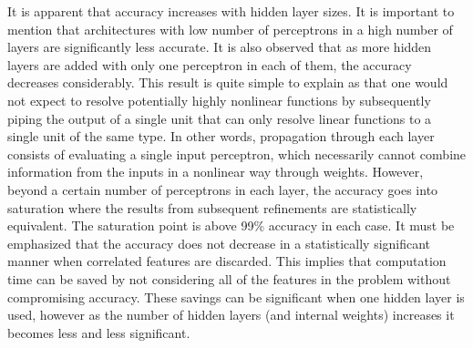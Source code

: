\documentclass[paper=a4, fontsize=11pt]{scrartcl} %
\begin{document}
It is apparent that accuracy increases with hidden layer sizes.
It is important to mention that architectures with low number of perceptrons in a high number of layers are significantly less accurate.
It is also observed that as more hidden layers are added with only one perceptron in each of them, the accuracy decreases considerably.
This result is quite simple to explain as that one would not expect to resolve potentially highly nonlinear functions by subsequently piping the output of a single unit that can only resolve linear functions to a single unit of the same type.
In other words, propagation through each layer consists of evaluating a single input perceptron, which necessarily cannot combine information from the inputs in a nonlinear way through weights.
However, beyond a certain number of perceptrons in each layer, the accuracy goes into saturation where the results from subsequent refinements are statistically equivalent.
The saturation point is above 99\% accuracy in each case.
It must be emphasized that the accuracy does not decrease in a statistically significant manner when correlated features are discarded.
This implies that computation time can be saved by not considering all of the features in the problem without compromising accuracy.
These savings can be significant when one hidden layer is used, however as the number of hidden layers (and internal weights) increases it becomes less and less significant.
\end{document}

